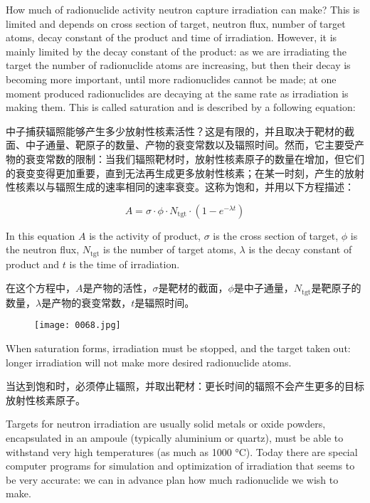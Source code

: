\documentclass[dvipsnames, svgnames,a4paper,11pt]{article}
\begin{document}
How much of radionuclide activity neutron capture irradiation can make? This is limited and depends on cross section of target, neutron flux, number of target atoms, decay constant of the product and time of irradiation. However, it is mainly limited by the decay constant of the product: as we are irradiating the target the number of radionuclide atoms are increasing, but then their decay is becoming more important, until more radionuclides cannot be made; at one moment produced radionuclides are decaying at the same rate as irradiation is making them. This is called saturation and is described by a following equation:

中子捕获辐照能够产生多少放射性核素活性？这是有限的，并且取决于靶材的截面、中子通量、靶原子的数量、产物的衰变常数以及辐照时间。然而，它主要受产物的衰变常数的限制：当我们辐照靶材时，放射性核素原子的数量在增加，但它们的衰变变得更加重要，直到无法再生成更多放射性核素；在某一时刻，产生的放射性核素以与辐照生成的速率相同的速率衰变。这称为饱和，并用以下方程描述：


$$A = \sigma \cdot \phi \cdot N_{\text{tgt}} \cdot (1 - e^{-\lambda t})
$$

In this equation $A$ is the activity of product, $\sigma$ is the cross section of target, $\phi$ is the neutron flux, $N_{\text{tgt}}$ is the number of target atoms, $\lambda$ is the decay constant of product and $t$ is the time of irradiation.

在这个方程中，$A$是产物的活性，$\sigma$是靶材的截面，$\phi$是中子通量，$N_{\text{tgt}}$是靶原子的数量，$\lambda$是产物的衰变常数，$t$是辐照时间。

\begin{figure}[ht]
    \centering
    \texttt{[image: 0068.jpg]}
     \label{fig58}
\end{figure}


When saturation forms, irradiation must be stopped, and the target taken out: longer irradiation will not make more desired radionuclide atoms.

当达到饱和时，必须停止辐照，并取出靶材：更长时间的辐照不会产生更多的目标放射性核素原子。

Targets for neutron irradiation are usually solid metals or oxide powders, encapsulated in an ampoule (typically aluminium or quartz), must be able to withstand very high temperatures (as much as 1000 °C). Today there are special computer programs for simulation and optimization of irradiation that seems to be very accurate: we can in advance plan how much radionuclide we wish to make.
\end{document}
